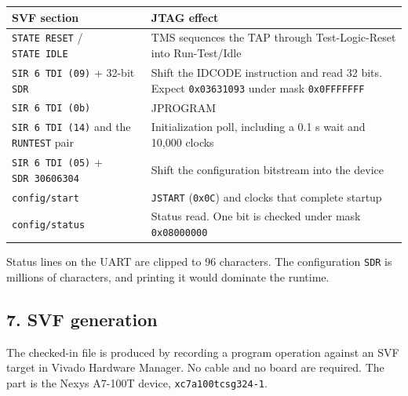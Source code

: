 \documentclass[
  11pt,
  a4paper,
]{article}
\newcounter{none} %
\begin{document}
{\def\LTcaptype{none} %
\begin{longtable}[]{@{}
  >{\raggedright\arraybackslash}p{}
  >{\raggedright\arraybackslash}p{}@{}}
\toprule\noalign{}
\begin{minipage}[b]{\linewidth}\raggedright
SVF section
\end{minipage} & \begin{minipage}[b]{\linewidth}\raggedright
JTAG effect
\end{minipage} \\
\midrule\noalign{}
\endhead
\bottomrule\noalign{}
\endlastfoot
\texttt{STATE\ RESET} / \texttt{STATE\ IDLE} & TMS sequences the TAP
through Test-Logic-Reset into Run-Test/Idle \\
\texttt{SIR\ 6\ TDI\ (09)} + 32-bit \texttt{SDR} & Shift the IDCODE
instruction and read 32 bits. Expect \texttt{0x03631093} under mask
\texttt{0x0FFFFFFF} \\
\texttt{SIR\ 6\ TDI\ (0b)} & JPROGRAM \\
\texttt{SIR\ 6\ TDI\ (14)} and the \texttt{RUNTEST} pair &
Initialization poll, including a 0.1 s wait and 10,000 clocks \\
\texttt{SIR\ 6\ TDI\ (05)} + \texttt{SDR\ 30606304} & Shift the
configuration bitstream into the device \\
\texttt{config/start} & \texttt{JSTART} (\texttt{0x0C}) and clocks that
complete startup \\
\texttt{config/status} & Status read. One bit is checked under mask
\texttt{0x08000000} \\
\end{longtable}
}

Status lines on the UART are clipped to 96 characters. The configuration
\texttt{SDR} is millions of characters, and printing it would dominate
the runtime.

\subsection{7. SVF generation}\label{svf-generation}

The checked-in file is produced by recording a program operation against
an SVF target in Vivado Hardware Manager. No cable and no board are
required. The part is the Nexys A7-100T device,
\texttt{xc7a100tcsg324-1}.
\end{document}
